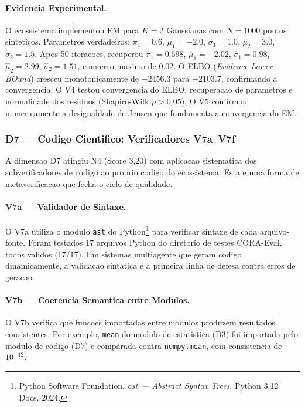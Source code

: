 \paragraph{Evidencia Experimental.}

O ecossistema implementou EM para $K=2$ Gaussianas com $N=1000$ pontos
sinteticos. Parametros verdadeiros: $\pi_1=0.6$, $\mu_1=-2.0$,
$\sigma_1=1.0$, $\mu_2=3.0$, $\sigma_2=1.5$. Apos 50 iteracoes,
recuperou $\hat{\pi}_1=0.598$, $\hat{\mu}_1=-2.02$, $\hat{\sigma}_1=0.98$,
$\hat{\mu}_2=2.99$, $\hat{\sigma}_2=1.51$, com erro maximo de 0.02.
O ELBO (\textit{Evidence Lower BOund}) cresceu monotonicamente de
$-2456.3$ para $-2103.7$, confirmando a convergencia. O V4 testou
convergencia do ELBO, recuperacao de parametros e normalidade dos
residuos (Shapiro-Wilk $p > 0.05$). O V5 confirmou numericamente
a desigualdade de Jensen que fundamenta a convergencia do EM.

\subsubsection{D7 --- Codigo Cientifico: Verificadores V7a--V7f}

A dimensao D7 atingiu N4 (Score 3,20) com aplicacao sistematica dos
subverificadores de codigo ao proprio codigo do ecossistema. Esta e
uma forma de metaverificacao que fecha o ciclo de qualidade.

\paragraph{V7a --- Validador de Sintaxe.}

O V7a utiliza o modulo \texttt{ast} do Python\footnote{Python Software
Foundation. \textit{ast --- Abstract Syntax Trees}. Python 3.12 Docs,
2024.} para verificar sintaxe de cada arquivo-fonte. Foram testados 17
arquivos Python do diretorio de testes CORA-Eval, todos validos (17/17).
Em sistemas multiagente que geram codigo dinamicamente, a validacao
sintatica e a primeira linha de defesa contra erros de geracao.

\paragraph{V7b --- Coerencia Semantica entre Modulos.}

O V7b verifica que funcoes importadas entre modulos produzem resultados
consistentes. Por exemplo, \texttt{mean} do modulo de estatistica (D3) foi
importada pelo modulo de codigo (D7) e comparada contra \texttt{numpy.mean},
com consistencia de $10^{-12}$.

